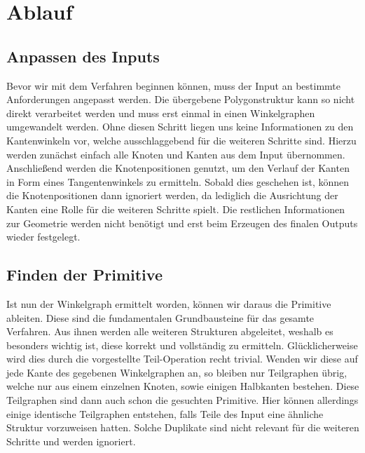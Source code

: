 \section{Ablauf}
\subsection{Anpassen des Inputs}
Bevor wir mit dem Verfahren beginnen können, muss der Input an bestimmte Anforderungen angepasst werden. Die übergebene Polygonstruktur
kann so nicht direkt verarbeitet werden und muss erst einmal in einen Winkelgraphen umgewandelt werden. Ohne diesen Schritt liegen uns keine
Informationen zu den Kantenwinkeln vor, welche ausschlaggebend für die weiteren Schritte sind. Hierzu werden zunächst einfach alle Knoten und
Kanten aus dem Input übernommen. Anschließend werden die Knotenpositionen genutzt, um den Verlauf der Kanten in Form eines Tangentenwinkels zu
ermitteln. Sobald dies geschehen ist, können die Knotenpositionen dann ignoriert werden, da lediglich die Ausrichtung der Kanten eine Rolle
für die weiteren Schritte spielt. Die restlichen Informationen zur Geometrie werden nicht benötigt und erst beim Erzeugen des finalen Outputs
wieder festgelegt.

\subsection{Finden der Primitive}
Ist nun der Winkelgraph ermittelt worden, können wir daraus die Primitive ableiten. Diese sind die fundamentalen Grundbausteine für das
gesamte Verfahren. Aus ihnen werden alle weiteren Strukturen abgeleitet, weshalb es besonders wichtig ist, diese korrekt und vollständig zu
ermitteln. Glücklicherweise wird dies durch die vorgestellte Teil-Operation recht trivial. Wenden wir diese auf jede Kante des gegebenen
Winkelgraphen an, so bleiben nur Teilgraphen übrig, welche nur aus einem einzelnen Knoten, sowie einigen Halbkanten bestehen. Diese Teilgraphen
sind dann auch schon die gesuchten Primitive. Hier können allerdings einige identische Teilgraphen entstehen, falls Teile des Input eine ähnliche
Struktur vorzuweisen hatten. Solche Duplikate sind nicht relevant für die weiteren Schritte und werden ignoriert.

